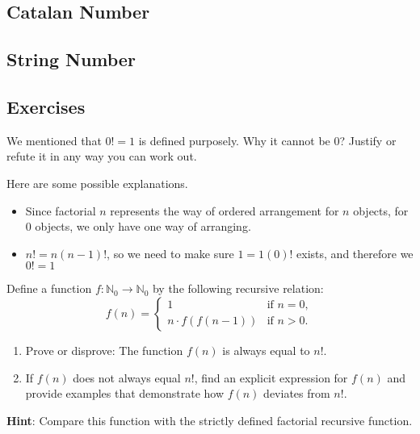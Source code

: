     \subsection{Catalan Number}

    \subsection{String Number}

    \subsection{Exercises}
        \begin{exercise}
            We mentioned that $0!=1$ is defined purposely. Why it cannot be 0?
            Justify or refute it in any way you can work out. 
        \end{exercise}
        \begin{solution}
            Here are some possible explanations.
            \begin{itemize}
                \item Since factorial $n$ represents the way of ordered arrangement
                for $n$ objects, for 0 objects, we only have one way of arranging.
                \item $n!=n(n-1)!$, so we need to make sure $1 = 1(0)!$ exists, and
                therefore we  $0!=1$
            \end{itemize}
        \end{solution}
        \begin{exercise}
            Define a function \( f: \mathbb{N}_0 \rightarrow \mathbb{N}_0 \) by the following recursive relation:
            \[
            f(n) =
            \begin{cases} 
            1 & \text{if } n = 0, \\
            n \cdot f(f(n-1)) & \text{if } n > 0.
            \end{cases}
            \]
            \begin{enumerate}
                \item Prove or disprove: The function \( f(n) \) is always equal to \( n! \).
                \item If \( f(n) \) does not always equal \( n! \), find an explicit expression for \( f(n) \) and provide examples that demonstrate how \( f(n) \) deviates from \( n! \).
            \end{enumerate}
            \textbf{Hint}: Compare this function with the strictly defined factorial
            recursive function.
        \end{exercise}
        
